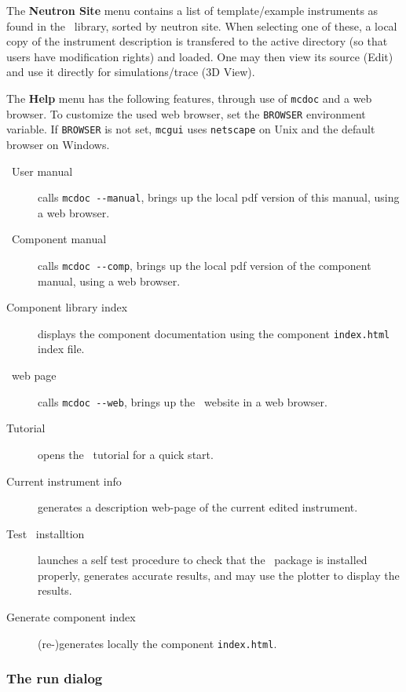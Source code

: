 \noindent The {\bf Neutron Site} menu contains a list of
template/example instruments as found in the \MCS\ library, sorted by
neutron site. When selecting one of these, a local copy of the
instrument description is transfered to the active directory (so that
users have modification rights) and loaded. One may then view its source (Edit) and use it directly for simulations/trace (3D View).

The {\bf Help} menu has the following features, through use of
\verb+mcdoc+ and a web browser. To customize the used web browser, set
the \verb+BROWSER+ environment variable. If \verb+BROWSER+ is not set,
\verb+mcgui+ uses \verb+netscape+ on Unix and the default browser on
Windows.
\begin{description}
\item[\MCS\ User manual] calls \verb+mcdoc --manual+, brings up the local
  pdf version of this manual, using a web browser.
\item[\MCS\ Component manual] calls \verb+mcdoc --comp+, brings up the local
  pdf version of the component manual, using a web browser.
\item[Component library index] displays the component documentation using
  the component \verb+index.html+ index file.
\item[\MCS\ web page] calls \verb+mcdoc --web+, brings up the \MCS\
  website in a web browser.
\item[Tutorial] opens the \MCS\ tutorial for a quick start.
\item[Current instrument info] generates a description web-page of the current edited instrument.
\item[Test \MCS\ installtion] launches a self test procedure to check that the \MCS\ package is installed properly, generates accurate results, and may use the plotter to display the results.
\item[Generate component index] (re-)generates locally the component \verb+index.html+.

\end{description}

\subsubsection{The run dialog}

